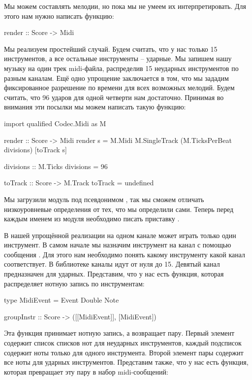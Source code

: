 Мы можем составлять мелодии, но пока мы не умеем их интерпретировать.
Для этого нам нужно написать функцию:


\begin{code}
render :: Score -> Midi
\end{code}

Мы реализуем простейший случай. Будем считать, что у нас только 15
инструментов, а все остальные инструменты -- ударные. Мы запишем нашу
музыку на один трек midi-файла, распределив 15 неударных инструментов по
разным каналам. Ещё одно упрощение заключается в том, что мы зададим
фиксированное разрешение по времени для всех возможных мелодий. Будем
считать, что 96 ударов для одной четверти нам достаточно. Принимая во
внимания эти посылки мы можем написать такую функцию:


\begin{code}
import qualified Codec.Midi as M

render :: Score -> Midi
render s = M.Midi M.SingleTrack (M.TicksPerBeat divisions) [toTrack s]

divisions :: M.Ticks
divisions = 96

toTrack :: Score -> M.Track 
toTrack = undefined
\end{code}

Мы загрузили модуль  под псевдонимом , так мы
сможем отличать низкоуровневые определения от тех, что мы определили
сами. Теперь перед каждым именем из модуля  необходимо
писать приставку .

В нашей упрощённой реализации на одном канале может играть только один
инструмент. В самом начале мы назначим инструмент на канал с помощью
сообщения . Для этого нам необходимо понять какому
инструменту какой канал соответствует. В библиотеке  каналы
идут от нуля до 15. Девятый канал предназначен для ударных. Представим,
что у нас есть функция, которая распределяет нотную запись по
инструментам:


\begin{code}
type MidiEvent = Event Double Note

groupInstr :: Score -> ([[MidiEvent]], [MidiEvent])
\end{code}

Эта функция принимает нотную запись, а возвращает пару. Первый элемент
содержит список списков нот для неударных инструментов, каждый подсписок
содержит ноты только для одного инструмента. Второй элемент пары
содержит все ноты для ударных инструментов. Представим также, что у нас
есть функция, которая превращает эту пару в набор midi-сообщений:


